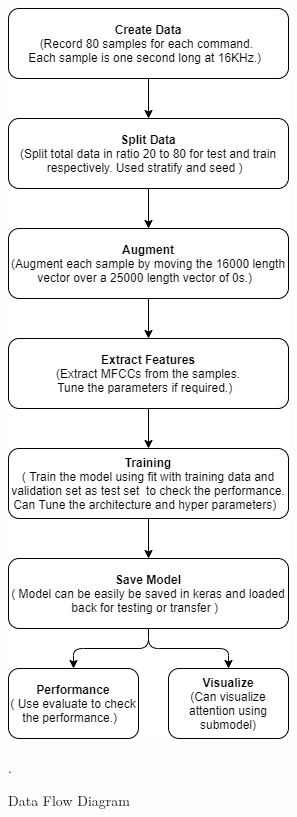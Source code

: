 \documentclass[11pt,english]{article}
\begin{document}
\begin{figure}[!ht]
\centering
\includegraphics[width=\columnwidth]{./Figs/Flow.png}
\caption{ Data Flow Diagram}.
\label{fig: Flow}	
\end{figure}
\end{document}
